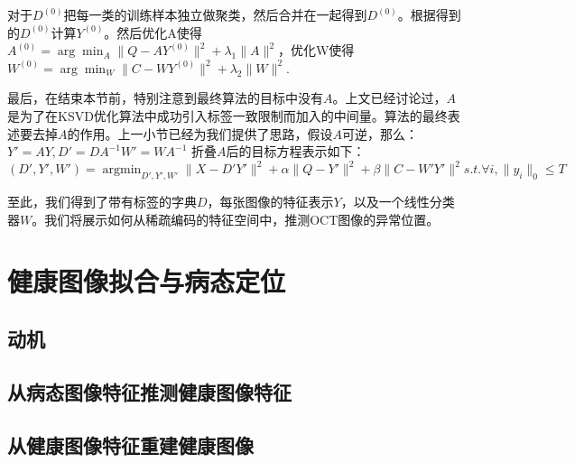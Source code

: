     对于$D^{(0)}$把每一类的训练样本独立做聚类，然后合并在一起得到$D^{(0)}$。根据得到的$D^{(0)}$计算$Y^{(0)}$。然后优化A使得 $A^{(0)} = \arg\min _{A} \|Q - AY^{(0)}\|^2 + \lambda_1 \|A\|^2$，优化W使得$W^{(0)} = \arg\min_{W} \|C - WY^{(0)}\|^2+ \lambda_2\|W\|^2$.

    最后，在结束本节前，特别注意到最终算法的目标中没有$A$。上文已经讨论过，$A$是为了在KSVD优化算法中成功引入标签一致限制而加入的中间量。算法的最终表述要去掉$A$的作用。上一小节已经为我们提供了思路，假设$A$可逆，那么：$Y' = AY, D' = D A^{-1} W' = W A^{-1}$ 折叠$A$后的目标方程表示如下：
    \begin{equation}
    \label{alg:lc-ksvd3}
    (D', Y', W') = \mathop{\arg\min}_{D', Y', W'} \| X - D'Y'\|^2 + \alpha \|Q - Y'\| ^2 + \beta\|C - W' Y' \| ^2 s.t. \forall i, \|y_i\|_0 \le T 
    \end{equation}

    至此，我们得到了带有标签的字典$D$，每张图像的特征表示$Y$，以及一个线性分类器$W$。我们将展示如何从稀疏编码的特征空间中，推测OCT图像的异常位置。

\section{健康图像拟合与病态定位}
\label{sec:norm-recon}
    \subsection{动机}
    \subsection{从病态图像特征推测健康图像特征}
    \subsection{从健康图像特征重建健康图像}




